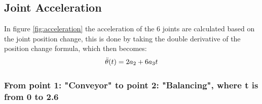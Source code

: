 \subsection{Joint Acceleration}
In figure \ref{fig:acceleration} the acceleration of the 6 joints are calculated based on the joint position change, this is done by taking the double derivative of the position change formula, which then becomes:
\begin{equation}
\Ddot{\theta}(t)=2a_2+6a_3t
\end{equation}

\subsubsection{From point 1: "Conveyor" to point 2: "Balancing", where t is from 0 to 2.6}

